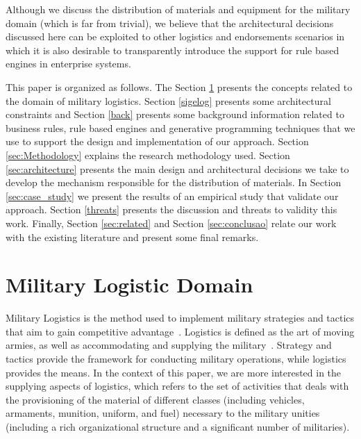 \documentclass[AMA,STIX1COL]{WileyNJD-v2}
\begin{document}
Although we discuss the distribution of materials and equipment for the military domain (which is far from trivial), we believe that the architectural decisions discussed here can be exploited to other logistics and endorsements scenarios in which it is also desirable to transparently introduce the support for rule based engines in enterprise systems.

This paper is organized as follows. The Section \ref{sec:logistics} presents the concepts related to the domain of military logistics. Section \ref{sigelog} presents some architectural constraints and Section \ref{back} presents some background information related to business rules, rule based engines and generative programming techniques that we use to support the design and implementation of our approach. Section \ref{sec:Methodology} explains the research methodology used. Section \ref{sec:architecture} presents the main design and architectural decisions we take to develop the mechanism responsible for the distribution of materials. In Section \ref{sec:case_study} we present the results of an empirical study that validate our approach. Section \ref{threats} presents the discussion and threats to validity this work. Finally, Section \ref{sec:related} and Section \ref{sec:conclusao} relate our work with the existing literature and present some final remarks.









\section{Military Logistic Domain}
\label{sec:logistics}

Military Logistics is the method used to implement military strategies and tactics that aim to gain competitive advantage~\cite{rutner2012}. Logistics is defined as the art of moving armies, as well as accommodating and supplying the military~\cite{prebilic2006}. Strategy and tactics provide the framework for conducting military operations, while logistics provides the means. In the context of this paper, we are more interested in the supplying aspects of logistics, which refers to the set of activities that deals with the  provisioning of the material of different classes (including vehicles, armaments, munition, uniform, and fuel) necessary to the military unities (including a rich organizational structure and a significant number of militaries). 
\end{document}
